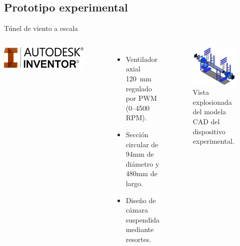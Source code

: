 \subsection{Prototipo experimental}
\begin{frame}{Túnel de viento a escala}
    \begin{columns}
        \centering
        \includegraphics[height=0.1\textwidth]{dump/inventor.png}
        \\[0.5cm]
        \begin{itemize}
          \item Ventilador axial 120~mm regulado por PWM (0--4500 RPM).
          \item Sección circular de 94mm de diámetro y 480mm de largo.
          \item Diseño de cámara suspendida mediante resortes.
        \end{itemize}
            \begin{block}{}
            \begin{figure}[ht!]
                \centering
                \includegraphics[width=\textwidth]{dump/explo.png}
                \caption{Vista explosionada del modela CAD del dispositivo experimental.}
            \end{figure}
            \end{block}
    \end{columns}
\end{frame}

